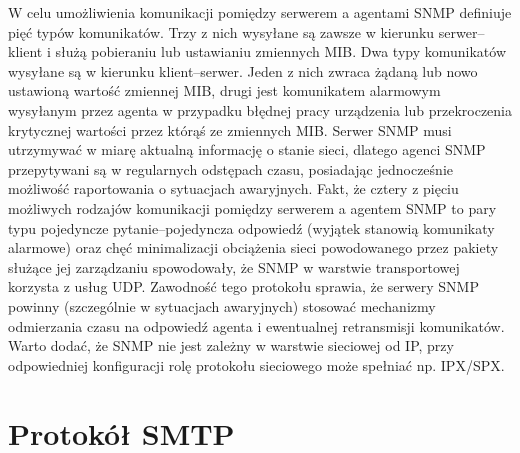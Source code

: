 W celu umożliwienia komunikacji pomiędzy serwerem a agentami SNMP definiuje pięć typów komunikatów. Trzy 
z nich wysyłane są zawsze w kierunku serwer--klient i służą pobieraniu lub ustawianiu zmiennych MIB. Dwa typy 
komunikatów wysyłane są w kierunku klient--serwer. Jeden z nich zwraca żądaną lub nowo ustawioną wartość 
zmiennej MIB, drugi jest komunikatem alarmowym wysyłanym przez agenta w przypadku błędnej pracy urządzenia lub 
przekroczenia krytycznej wartości przez którąś ze zmiennych MIB.
Serwer SNMP musi utrzymywać w miarę aktualną informację o stanie sieci, dlatego agenci SNMP przepytywani 
są w regularnych odstępach czasu, posiadając jednocześnie możliwość raportowania o sytuacjach awaryjnych. Fakt, 
że cztery z pięciu możliwych rodzajów komunikacji pomiędzy serwerem a agentem SNMP to pary typu pojedyncze 
pytanie--pojedyncza odpowiedź (wyjątek stanowią komunikaty alarmowe) oraz chęć minimalizacji obciążenia sieci 
powodowanego przez pakiety służące jej zarządzaniu spowodowały, że SNMP w warstwie transportowej korzysta z 
usług UDP. Zawodność tego protokołu sprawia, że serwery SNMP powinny (szczególnie w sytuacjach awaryjnych) 
stosować mechanizmy odmierzania czasu na odpowiedź agenta i ewentualnej retransmisji komunikatów. Warto dodać, 
że SNMP nie jest zależny w warstwie sieciowej od IP, przy odpowiedniej konfiguracji rolę protokołu sieciowego 
może spełniać np. IPX/SPX.

\section{Protokół SMTP}

